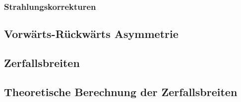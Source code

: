 \subsubsection{Strahlungskorrekturen}
\subsection{Vorwärts-Rückwärts Asymmetrie}
\subsection{Zerfallsbreiten}
\subsection{Theoretische Berechnung der Zerfallsbreiten}